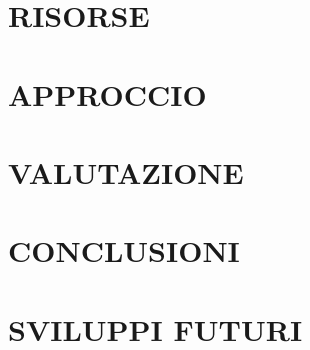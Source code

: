 \documentclass[10pt,a4paper]{article}
\begin{document}
\section{RISORSE}
\section{APPROCCIO}
\section{VALUTAZIONE}

\section{CONCLUSIONI}

\section{SVILUPPI FUTURI}
\end{document}
